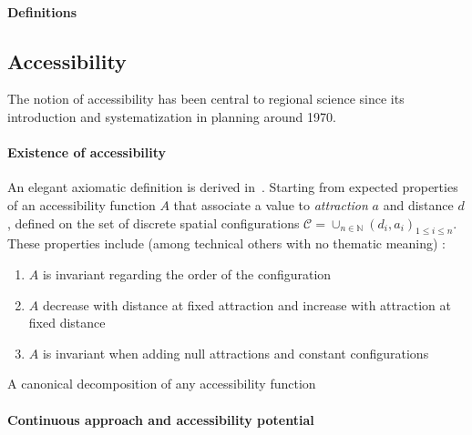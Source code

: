 \paragraph{Definitions}



\subsection{Accessibility}


The notion of accessibility has been central to regional science since its introduction and systematization in planning around 1970. 

\paragraph{Existence of accessibility}

An elegant axiomatic definition is derived in~\cite{weibull1976axiomatic}. Starting from expected properties of an accessibility function $A$ that associate a value to \emph{attraction} $a$ and distance $d$, defined on the set of discrete spatial configurations $\mathcal{C} = \cup_{n\in \mathbb{N}}{(d_i,a_i)_{1\leq i \leq n}}$. These properties include (among technical others with no thematic meaning) :
\begin{enumerate}
\item $A$ is invariant regarding the order of the configuration
\item $A$ decrease with distance at fixed attraction and increase with attraction at fixed distance
\item $A$ is invariant when adding null attractions and constant configurations
\end{enumerate}

A canonical decomposition of any accessibility function 


\paragraph{Continuous approach and accessibility potential}








